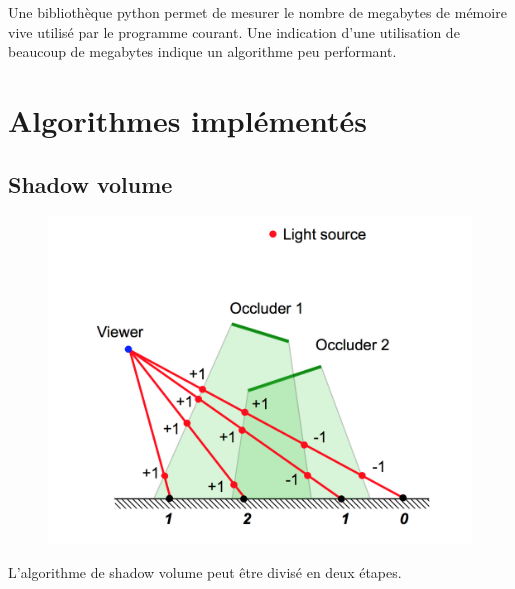 \documentclass[a4paper,10pt]{report}
\begin{document}
Une bibliothèque python permet de mesurer le nombre de megabytes de mémoire vive utilisé par le programme courant. Une indication d'une utilisation de beaucoup de megabytes indique un algorithme peu performant.



\section{Algorithmes implémentés} 

\subsection{Shadow volume}

\begin{figure}[H]

\includegraphics[scale=0.32]{images/shadow_volume.png}
\centering
{}
\end{figure}
L'algorithme de shadow volume peut être divisé en deux étapes.
\end{document}
